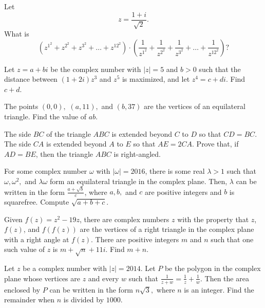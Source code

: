 \documentclass{article}
\begin{document}
\begin{prob}[AMC 12A 2019/21]{4}
Let\[z=\frac{1+i}{\sqrt{2}}.\]What is\[\left(z^{1^2}+z^{2^2}+z^{3^2}+\dots+z^{{12}^2}\right) \cdot \left(\frac{1}{z^{1^2}}+\frac{1}{z^{2^2}}+\frac{1}{z^{3^2}}+\dots+\frac{1}{z^{{12}^2}}\right)?\]
\end{prob}

\begin{req}[AIME II 2012/6]{4}
Let $z = a + bi$ be the complex number with $|z| = 5$ and $b > 0$ such that the distance between $(1 + 2i)z^3$ and $z^5$ is maximized, and let $z^4 = c + di$. Find $c+d$.
\end{req}

\begin{prob}[AIME 1994/8]{4}
The points $(0,0),$ $(a,11),$ and $(b,37)$ are the vertices of an equilateral triangle. Find the value of $ab.$
\end{prob}   

\begin{prob}[EGMO 2013/1]{4}
The side $BC$ of the triangle $ABC$ is extended beyond $C$ to $D$ so that $CD = BC$. The side $CA$ is extended beyond $A$ to $E$ so that $AE = 2CA$. Prove that, if $AD=BE$, then the triangle $ABC$ is right-angled.
\end{prob}

\begin{req}{6}
For some complex number $\omega$ with $|\omega| = 2016$, there is some real $\lambda>1$ such that $\omega, \omega^{2},$ and $\lambda \omega$ form an equilateral triangle in the complex plane. Then, $\lambda$ can be written in the form $\tfrac{a + \sqrt{b}}{c}$, where $a,b,$ and $c$ are positive integers and $b$ is squarefree. Compute $\sqrt{a+b+c}$.
\end{req}

\begin{prob}[AIME I 2019/12]{6}
Given $f(z) = z^2-19z$, there are complex numbers $z$ with the property that $z$, $f(z)$, and $f(f(z))$ are the vertices of a right triangle in the complex plane with a right angle at $f(z)$. There are positive integers $m$ and $n$ such that one such value of $z$ is $m+\sqrt{n}+11i$. Find $m+n$.
\end{prob}

\begin{prob}[AIME II 2014/10]{6}
Let $z$ be a complex number with $|z| = 2014$. Let $P$ be the polygon in the complex plane whose vertices are $z$ and every $w$ such that $\tfrac{1}{z+w} = \tfrac{1}{z} + \tfrac{1}{w}$. Then the area enclosed by $P$ can be written in the form $n\sqrt{3},$ where $n$ is an integer. Find the remainder when $n$ is divided by $1000$.
\end{prob}
\end{document}

